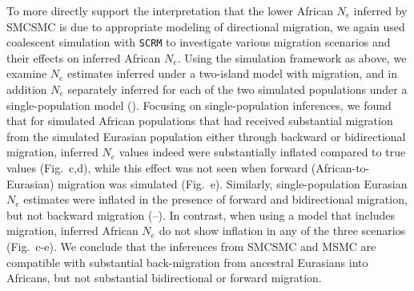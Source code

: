 To more directly support the interpretation that the lower African $N_e$ inferred by SMCSMC is due to appropriate modeling of directional migration, we again used coalescent simulation with {\tt SCRM} to investigate various migration scenarios and their effects on inferred African $N_e$. Using the simulation framework as above, we examine $N_e$ estimates inferred under a two-island model with migration, and in addition $N_e$ separately inferred for each of the two simulated populations under a single-population model ().  Focusing on single-population inferences, we found that for simulated African populations that had received substantial migration from the simulated Eurasian population either through backward or bidirectional migration, inferred $N_e$ values indeed were substantially inflated compared to true values (Fig.\ c,d), while this effect was not seen when forward (African-to-Eurasian) migration was simulated (Fig.\ e).  
Similarly, single-population Eurasian $N_e$ estimates were inflated in the presence of forward and bidirectional migration, but not backward migration (--).
In contrast, when using a model that includes migration, inferred African $N_e$ do not show inflation in any of the three scenarios (Fig.\ c-e). We conclude that the inferences from SMCSMC and MSMC are compatible with substantial back-migration from ancestral Eurasians into Africans, but not substantial bidirectional or forward migration.

